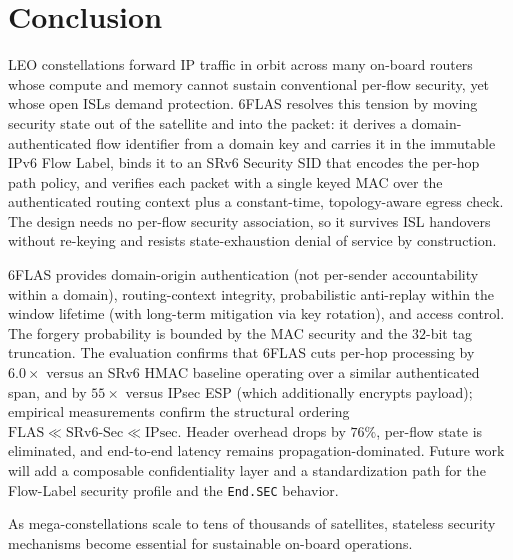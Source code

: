 \section{Conclusion}
\label{sec:conclusion}

LEO constellations forward IP traffic in orbit across many on-board routers
whose compute and memory cannot sustain conventional per-flow security, yet whose
open ISLs demand protection. 6FLAS resolves this tension by
moving security state out of the satellite and into the packet: it derives a
domain-authenticated flow identifier from a domain key and carries it in the immutable
IPv6 Flow Label, binds it to an SRv6 Security SID that encodes the per-hop path
policy, and verifies each packet with a single keyed MAC over the authenticated routing context plus a constant-time,
topology-aware egress check. The design needs no per-flow security association,
so it survives ISL handovers without re-keying and resists state-exhaustion
denial of service by construction.

6FLAS provides domain-origin authentication (not per-sender accountability within a domain), routing-context integrity,
probabilistic anti-replay within the window lifetime (with long-term mitigation via key rotation), and access control. The forgery probability is bounded by the MAC security and the $32$-bit tag truncation. The evaluation confirms that 6FLAS cuts per-hop processing by
$6.0\times$ versus an SRv6 HMAC baseline operating over a similar authenticated span, and by $55\times$ versus IPsec ESP (which additionally encrypts payload); empirical measurements
confirm the structural ordering $\text{FLAS} \ll \text{SRv6-Sec} \ll \text{IPsec}$.
Header overhead drops by $76\%$,
per-flow state is eliminated, and end-to-end latency remains
propagation-dominated. Future work will
add a composable confidentiality layer and
a standardization path for the Flow-Label security profile and the
\texttt{End.SEC} behavior.

As mega-constellations scale to tens of thousands of satellites, stateless security mechanisms become essential for sustainable on-board operations.
